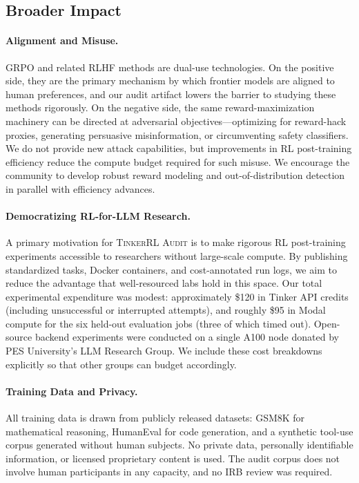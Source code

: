 \documentclass{article}
\newcommand{\ours}{\textsc{TinkerRL Audit}}
\begin{document}
\subsection{Broader Impact}
\label{sec:impact}

\paragraph{Alignment and Misuse.}
GRPO and related RLHF methods are dual-use technologies. On the positive side,
they are the primary mechanism by which frontier models are aligned to human
preferences, and our audit artifact lowers the barrier to studying these methods
rigorously. On the negative side, the same reward-maximization machinery can
be directed at adversarial objectives---optimizing for reward-hack proxies,
generating persuasive misinformation, or circumventing safety classifiers. We
do not provide new attack capabilities, but improvements in RL post-training
efficiency reduce the compute budget required for such misuse. We encourage
the community to develop robust reward modeling and out-of-distribution
detection in parallel with efficiency advances.

\paragraph{Democratizing RL-for-LLM Research.}
A primary motivation for \ours{} is to make rigorous RL post-training
experiments accessible to researchers without large-scale compute. By
publishing standardized tasks, Docker containers, and cost-annotated run
logs, we aim to reduce the advantage that well-resourced labs hold in this
space. Our total experimental expenditure was modest: approximately \$120 in
Tinker API credits (including unsuccessful or interrupted attempts),
and roughly \$95 in Modal compute for the six held-out evaluation jobs
(three of which timed out). Open-source backend experiments were conducted on
a single A100 node donated by PES University's LLM Research Group. We include
these cost breakdowns explicitly so that other groups can budget accordingly.

\paragraph{Training Data and Privacy.}
All training data is drawn from publicly released datasets: GSM8K
\citep{cobbe2021training} for mathematical reasoning, HumanEval
\citep{chen2021codex} for code generation, and a synthetic tool-use corpus
generated without human subjects. No private data, personally identifiable
information, or licensed proprietary content is used. The audit corpus does not
involve human participants in any capacity, and no IRB review was required.
\end{document}

